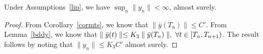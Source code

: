 \begin{theorem}\label{maintheoremslow}
Under Assumptions~\ref{lip}, we have $\sup_n\parallel y_n\parallel < \infty$, almost surely.
\end{theorem}
\begin{proof}
From Corollary~\ref{cormts}, we know that $\parallel \bar{y}(T_n)\parallel\leq C'$. 
From Lemma~\ref{bddy}, we know that $\parallel \bar{y}(t)\parallel \leq K_3 \parallel \bar{y}(T_n)\parallel, 
\mbox{ }\forall t\in [T_n,T_{n+1})$. The result follows by noting that $\parallel y_n\parallel \leq K_3C'$ almost
surely.
\end{proof}

\begin{comment}
\begin{theorem}\label{maintheoremslow}
Under Assumptions~\ref{lip}, we have $\sup_n||y_n||< \infty$, almost surely.
\end{theorem}
\begin{proof}
Since $0 \in \R^k$ is the unique globally asymptotically stable equilibrium of \eqref{odeiy}, choose $c_{1/8}$, and $T_{1/8}$ according to Lemma~\ref{neartraj} such that $||\chi_c(t,y)||<\frac{1}{4}, \forall t\geq T_{1/8}, c>c_{1/8}$. Pick $\epsilon$ and $c'_{1/8}=c_\epsilon$ in Lemma~\ref{tracky} such that $\epsilon L T_{1/8}e^{LT_{1/8}}<1/4$, for $c>c'_{1/8} $.
We claim that $||\bar{y}(T_{n})||<C_1^*$ for some $C_1^*>0$. Suppose this is not true, then there is a sequence $C_{n_k}, k\geq 0$ such that $C_{n_k}\ra \infty$ as $k\ra \infty$. Then for any $k'$ such that $C_{n_k'}>\max(c_{1/8},c'_{1/8})$, and sufficiently large $k''>m(n_{k'})$, we have $||\hat{y}_n||<1, n\geq k''$, i.e., the iterates $\hat{y}_n$ do not leave the unit ball around origin, and since $||x_n||\leq K^*$, $C_{n_k}$ cannot grow to $\infty$ as $k \ra \infty$, which is a contradiction, so $||\bar{y}(T_{n})||<C_1^*$ for some $C_1^*>0$. From Lemma~\ref{bddy}, we have $||y_n||\leq K_3C_1^*$.
\end{proof}\\
\begin{theorem}\label{stabfull}
$\sup_n||z_n|| < \infty$.
\end{theorem}
\begin{proof}
Follows from Theorems~\ref{maintheoremslow} $\&$ ~\ref{maintheorem}. 
\end{proof}
\end{comment}

